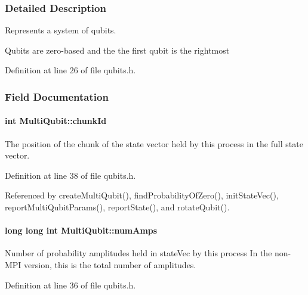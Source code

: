 \subsubsection{Detailed Description}
Represents a system of qubits. 

Qubits are zero-\/based and the the first qubit is the rightmost 

Definition at line 26 of file qubits.\+h.



\subsubsection{Field Documentation}
\paragraph[{\texorpdfstring{chunk\+Id}{chunkId}}]{\setlength{\rightskip}{0pt plus 5cm}int Multi\+Qubit\+::chunk\+Id}\hypertarget{structMultiQubit_ab10c88249fa3825d6227ceec01d37e37}{}\label{structMultiQubit_ab10c88249fa3825d6227ceec01d37e37}


The position of the chunk of the state vector held by this process in the full state vector. 



Definition at line 38 of file qubits.\+h.



Referenced by create\+Multi\+Qubit(), find\+Probability\+Of\+Zero(), init\+State\+Vec(), report\+Multi\+Qubit\+Params(), report\+State(), and rotate\+Qubit().

\paragraph[{\texorpdfstring{num\+Amps}{numAmps}}]{\setlength{\rightskip}{0pt plus 5cm}long long int Multi\+Qubit\+::num\+Amps}\hypertarget{structMultiQubit_ae16f47d8b725c914fb7f66b6498d79db}{}\label{structMultiQubit_ae16f47d8b725c914fb7f66b6498d79db}


Number of probability amplitudes held in state\+Vec by this process In the non-\/\+M\+PI version, this is the total number of amplitudes. 



Definition at line 36 of file qubits.\+h.



